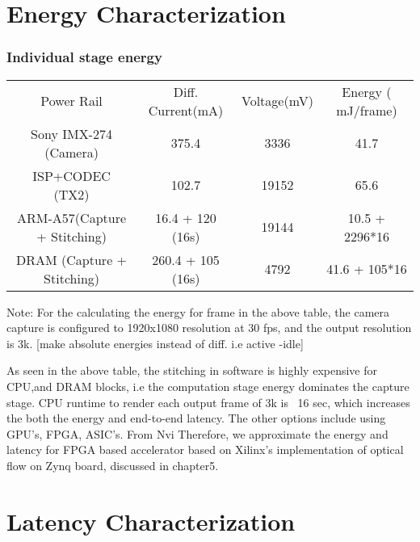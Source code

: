 \section{Energy Characterization}
\subsubsection{Individual stage energy}

	\begin{tabular}{c|c|c|c}
	Power Rail & Diff. Current(mA) & Voltage(mV) & Energy ( mJ/frame) \\
	Sony IMX-274 (Camera) & 375.4 & 3336 & 41.7 \\
	ISP+CODEC (TX2) & 102.7 & 19152 & 65.6 \\
	ARM-A57(Capture + Stitching) & 16.4 + 120 (16s) & 19144 & 10.5 + 2296*16\\
	DRAM (Capture + Stitching)  & 260.4 + 105 (16s)  & 4792 & 41.6 + 105*16 \\
	\end{tabular} \newline \newline

	Note: For the calculating the energy for frame in the above table, the camera capture is configured to 1920x1080 resolution at 30 fps, and the output resolution is 3k. [make absolute energies instead of diff. i.e active -idle]\newline
	
	As seen in the above table, the stitching in software is highly expensive for CPU,and DRAM blocks, i.e the computation stage energy dominates the capture stage. CPU runtime to render each output frame of 3k is ~16 sec, which increases the both the energy and end-to-end latency. The other options include using GPU's, FPGA, ASIC's. From Nvi   Therefore, we approximate the energy and latency for FPGA based accelerator based on Xilinx's implementation of optical flow on Zynq board, discussed in chapter5.\newline

\section{Latency Characterization}

